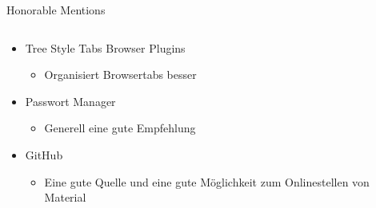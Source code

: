 \documentclass[aspectratio=169,shownotes]{beamer}
\begin{document}
\begin{frame}{Honorable Mentions}
\begin{columns}[t]
\begin{column}{0.6\textwidth}
\begin{itemize}
\begin{itemize}
                \end{itemize}  
                \item Tree Style Tabs Browser Plugins
                \begin{itemize}
                    \item Organisiert Browsertabs besser
                \end{itemize}  
                \item Passwort Manager
                \begin{itemize}
                    \item Generell eine gute Empfehlung
                \end{itemize}  
                \item GitHub
                \begin{itemize}
                    \item Eine gute Quelle und eine gute Möglichkeit zum Onlinestellen von Material
                \end{itemize} 
            \end{itemize}
        \end{column}
    \end{columns}
\end{frame}
\end{document}
